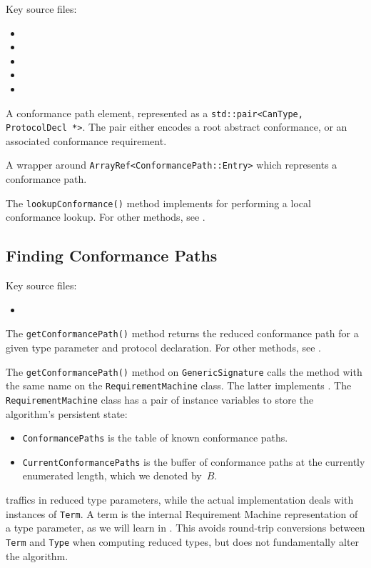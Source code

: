 \documentclass[../generics]{subfiles}
\begin{document}
Key source files:
\begin{itemize}
\item {}
\item {}
\item {}
\item {}
\item {}
\end{itemize}

A conformance path element, represented as a \verb|std::pair<CanType, ProtocolDecl *>|. The pair either encodes a root abstract conformance, or an associated conformance requirement.

A wrapper around \verb|ArrayRef<ConformancePath::Entry>| which represents a conformance path.

The \verb|lookupConformance()| method implements  for performing a local conformance lookup. For other methods, see .

\subsection*{Finding Conformance Paths}

Key source files:
\begin{itemize}
\item {}
\end{itemize}

The \texttt{getConformancePath()} method returns the reduced conformance path for a given type parameter and protocol declaration. For other methods, see .

The \texttt{getConformancePath()} method on \texttt{GenericSignature} calls the method with the same name on the \texttt{RequirementMachine} class. The latter implements . The \texttt{RequirementMachine} class has a pair of instance variables to store the algorithm's persistent state:
\begin{itemize}
\item \texttt{ConformancePaths} is the table of known conformance paths.
\item \texttt{CurrentConformancePaths} is the buffer of conformance paths at the currently enumerated length, which we denoted by~$B$.
\end{itemize}
 traffics in reduced type parameters, while the actual implementation deals with instances of \verb|Term|. A term is the internal Requirement Machine representation of a type parameter, as we will learn in . This avoids round-trip conversions between \verb|Term| and \verb|Type| when computing reduced types, but does not fundamentally alter the algorithm.
\end{document}
